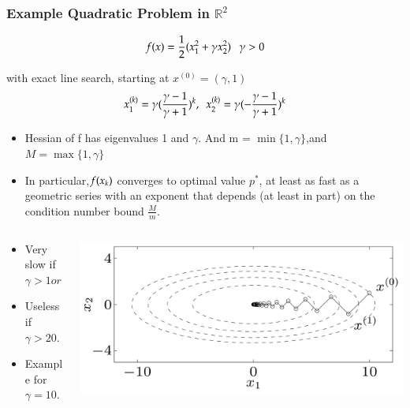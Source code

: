 \begin{frame}
  \frametitle{Example Quadratic Problem in $\mathbb{R}^2$}

{
\tiny

$$f(x) = \frac{1}{2}(x_1^2 + \gamma x_{2}^2) ~~~ \gamma > 0$$

with exact line search, starting at $x^{(0)} = (\gamma, 1)$
$$x_{1}^{(k)} = \gamma (\frac{\gamma - 1}{\gamma + 1})^k, ~~
x_{2}^{(k)} = \gamma (-\frac{\gamma - 1}{\gamma + 1})^k$$
}
\vspace{-8mm}

{
\tiny
\begin{itemize}
\item Hessian of f has eigenvalues 1 and $\gamma$. And m = $\min\{1,
    \gamma\}$,and $M = \max\{1, \gamma\}$
\item In particular,$f(x_{k})$ converges to optimal value $p^*$,  at
  least as fast as a geometric series with an exponent that depends
  (at least in part) on the condition number bound $\frac{M}{m}$.

\end{itemize}


}
\begin{columns}

  \begin{column}{0.6\textwidth}


\begin{itemize}
\item Very slow if $\gamma > 1 or ~ \gamma < 1$
\item Useless if $\gamma > 20$.
\item Example for $\gamma = 10$.
\end{itemize}
\end{column}

\begin{column}{0.5\textwidth}
\includegraphics[scale=0.12, center]{pics/example.png}
\end{column}


\end{columns}
\end{frame}


